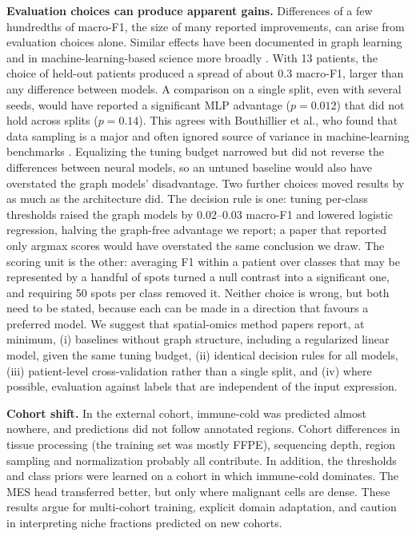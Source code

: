 \documentclass[11pt,letterpaper]{article}
\begin{document}
\textbf{Evaluation choices can produce apparent gains.} Differences of a few hundredths of macro-F1, the size of many reported improvements, can arise from evaluation choices alone. Similar effects have been documented in graph learning \cite{shchur2018,errica2020} and in machine-learning-based science more broadly \cite{kapoor2023,varoquaux2022}. With 13 patients, the choice of held-out patients produced a spread of about 0.3 macro-F1, larger than any difference between models. A comparison on a single split, even with several seeds, would have reported a significant MLP advantage ($p = 0.012$) that did not hold across splits ($p = 0.14$). This agrees with Bouthillier et al., who found that data sampling is a major and often ignored source of variance in machine-learning benchmarks \cite{bouthillier2021}. Equalizing the tuning budget narrowed but did not reverse the differences between neural models, so an untuned baseline would also have overstated the graph models' disadvantage. Two further choices moved results by as much as the architecture did. The decision rule is one: tuning per-class thresholds raised the graph models by 0.02--0.03 macro-F1 and lowered logistic regression, halving the graph-free advantage we report; a paper that reported only argmax scores would have overstated the same conclusion we draw. The scoring unit is the other: averaging F1 within a patient over classes that may be represented by a handful of spots turned a null contrast into a significant one, and requiring 50 spots per class removed it. Neither choice is wrong, but both need to be stated, because each can be made in a direction that favours a preferred model. We suggest that spatial-omics method papers report, at minimum, (i) baselines without graph structure, including a regularized linear model, given the same tuning budget, (ii) identical decision rules for all models, (iii) patient-level cross-validation rather than a single split, and (iv) where possible, evaluation against labels that are independent of the input expression.

\textbf{Cohort shift.} In the external cohort, immune-cold was predicted almost nowhere, and predictions did not follow annotated regions. Cohort differences in tissue processing (the training set was mostly FFPE), sequencing depth, region sampling and normalization probably all contribute. In addition, the thresholds and class priors were learned on a cohort in which immune-cold dominates. The MES head transferred better, but only where malignant cells are dense. These results argue for multi-cohort training, explicit domain adaptation, and caution in interpreting niche fractions predicted on new cohorts.
\end{document}
